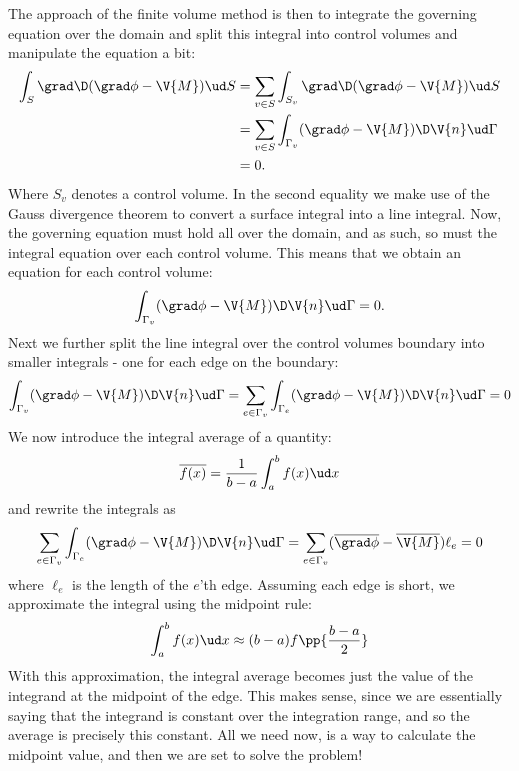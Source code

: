 \documentclass[sigconf]{acmart}
\begin{document}
The approach of the finite volume method is then to integrate the governing equation over the domain and split this integral into control volumes and manipulate the equation a bit:
\begin{align}
	\int_S \grad \D (\grad \phi - \V{M}) \ud S &= \sum_{v \in S} \int_{S_v} \grad \D (\grad \phi - \V{M}) \ud S \\
	&= \sum_{v \in S} \int_{\Gamma_v} (\grad \phi - \V{M}) \D \V{n}\ud \Gamma \\
	&= 0.
\end{align}
Where $ S_v $ denotes a control volume. In the second equality we make use of the Gauss divergence theorem to convert a surface integral into a line integral. Now, the governing equation must hold all over the domain, and as such, so must the integral equation over each control volume. This means that we obtain an equation for each control volume:
\begin{equation}\label{key}
	\int_{\Gamma_v} (\grad \phi - \V{M}) \D \V{n}\ud \Gamma = 0.
\end{equation}
Next we further split the line integral over the control volumes boundary into smaller integrals - one for each edge on the boundary:
\begin{equation}\label{key}
	\int_{\Gamma_v} (\grad \phi - \V{M}) \D \V{n}\ud \Gamma = \sum_{e \in \Gamma_v} \int_{\Gamma_e} (\grad \phi - \V{M}) \D \V{n}\ud \Gamma = 0
\end{equation}
We now introduce the integral average of a quantity:
\begin{equation}\label{key}
	\overline{f(x)} = \frac{1}{b-a} \int_{a}^{b} f(x) \ud x 
\end{equation} 
and rewrite the integrals as
\begin{equation}\label{key}
	\sum_{e \in \Gamma_v} \int_{\Gamma_e} (\grad \phi - \V{M}) \D \V{n}\ud \Gamma = \sum_{e\in \Gamma_v} (\overline{\grad\phi} - \overline{\V{M}} )\ell_e = 0
\end{equation}
where $ \ell_e $ is the length of the $ e $'th edge. Assuming each edge is short, we approximate the integral using the midpoint rule:
\begin{equation}\label{key}
	\int_{a}^{b} f(x) \ud x \approx (b-a) f\pp{\frac{b-a}{2}}
\end{equation}
With this approximation, the integral average becomes just the value of the integrand at the midpoint of the edge. This makes sense, since we are essentially saying that the integrand is constant over the integration range, and so the average is precisely this constant. All we need now, is a way to calculate the midpoint value, and then we are set to solve the problem!
\end{document}
